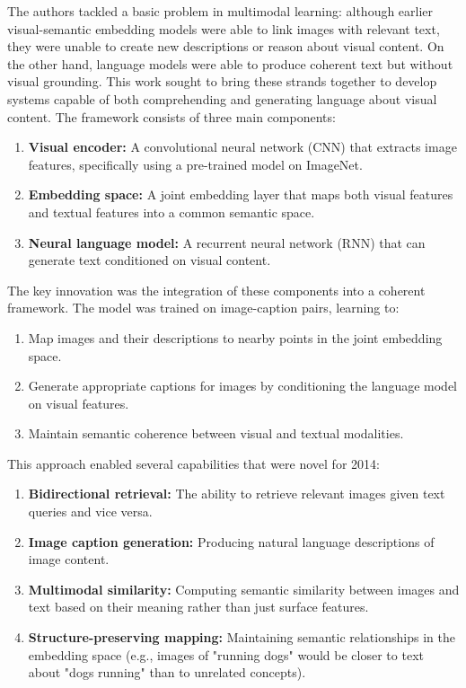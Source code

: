 \documentclass[conference]{IEEEtran}
\begin{document}
\begin{enumerate}
The authors tackled a basic problem in multimodal learning: although earlier visual-semantic embedding models were able to link images with relevant text, they were unable to create new descriptions or reason about visual content. On the other hand, language models were able to produce coherent text but without visual grounding. This work sought to bring these strands together to develop systems capable of both comprehending and generating language about visual content.
The framework consists of three main components:
\begin{enumerate}
\item \textbf{Visual encoder:} A convolutional neural network (CNN) that extracts image features, specifically using a pre-trained model on ImageNet.
\item \textbf{Embedding space:} A joint embedding layer that maps both visual features and textual features into a common semantic space.
\item \textbf{Neural language model:} A recurrent neural network (RNN) that can generate text conditioned on visual content.
\end{enumerate}
The key innovation was the integration of these components into a coherent framework. The model was trained on image-caption pairs, learning to:
\begin{enumerate}
\item Map images and their descriptions to nearby points in the joint embedding space.
\item Generate appropriate captions for images by conditioning the language model on visual features.
\item Maintain semantic coherence between visual and textual modalities.
\end{enumerate}
This approach enabled several capabilities that were novel for 2014:
\begin{enumerate}
\item \textbf{Bidirectional retrieval:} The ability to retrieve relevant images given text queries and vice versa.
\item \textbf{Image caption generation:} Producing natural language descriptions of image content.
\item \textbf{Multimodal similarity:} Computing semantic similarity between images and text based on their meaning rather than just surface features.
\item \textbf{Structure-preserving mapping:} Maintaining semantic relationships in the embedding space (e.g., images of "running dogs" would be closer to text about "dogs running" than to unrelated concepts).

\end{enumerate}
\end{enumerate}
\end{document}
